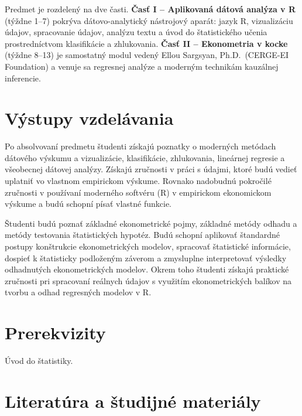 \documentclass[11pt]{article}
\begin{document}
Predmet je rozdelený na dve časti. \textbf{Časť I -- Aplikovaná dátová analýza v R} (týždne 1--7) pokrýva
dátovo-analytický nástrojový aparát: jazyk R, vizualizáciu údajov, spracovanie údajov, analýzu textu a úvod
do štatistického učenia prostredníctvom klasifikácie a zhlukovania. \textbf{Časť II -- Ekonometria v kocke}
(týždne 8--13) je samostatný modul vedený Ellou Sargsyan, Ph.D.\ (CERGE-EI Foundation) a venuje sa regresnej
analýze a moderným technikám kauzálnej inferencie.

\section{Výstupy vzdelávania}

Po absolvovaní predmetu študenti získajú poznatky o moderných metódach dátového výskumu a vizualizácie,
klasifikácie, zhlukovania, lineárnej regresie a všeobecnej dátovej analýzy. Získajú zručnosti v práci s
údajmi, ktoré budú vedieť uplatniť vo vlastnom empirickom výskume. Rovnako nadobudnú pokročilé zručnosti v
používaní moderného softvéru (R) v empirickom ekonomickom výskume a budú schopní písať vlastné funkcie.

Študenti budú poznať základné ekonometrické pojmy, základné metódy odhadu a metódy testovania štatistických
hypotéz. Budú schopní aplikovať štandardné postupy konštrukcie ekonometrických modelov, spracovať
štatistické informácie, dospieť k štatisticky podloženým záverom a zmysluplne interpretovať výsledky
odhadnutých ekonometrických modelov. Okrem toho študenti získajú praktické zručnosti pri spracovaní
reálnych údajov s využitím ekonometrických balíkov na tvorbu a odhad regresných modelov v R.

\section{Prerekvizity}

Úvod do štatistiky.

\section{Literatúra a študijné materiály}
\end{document}
